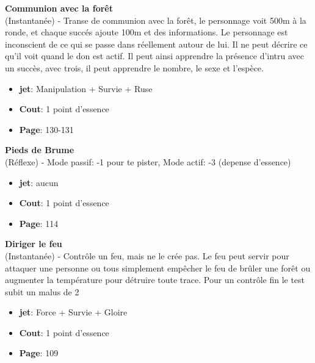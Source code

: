 \documentclass[oneside,12pt]{book}
\newcommand\don[6]{
\textbf{#1} \\
(#6) - #2
\begin{itemize}
\item{ \textbf{jet}: #3}
\item{ \textbf{Cout}: #4}
\item{ \textbf{Page}: #5}
\end{itemize}
\vspace{0.5cm}
}
\begin{document}
\begin{flushleft}
\don{Communion avec la forêt}{Transe de communion avec la forêt, le personnage voit 500m à la ronde, et chaque succés ajoute 100m et des informations. Le personnage est inconscient de ce qui se passe dans réellement autour de lui. Il ne peut décrire ce qu'il voit quand le don est actif. Il peut ainsi apprendre la présence d'intru avec un succès, avec trois, il peut apprendre le nombre, le sexe et l'espèce.}{Manipulation + Survie + Ruse}{1 point d'essence}{130-131}{Instantanée}
\don{Pieds de Brume}{Mode passif: -1 pour te pister, Mode actif: -3 (depense d'essence)}{aucun}{1 point d'essence}{114}{Réflexe}
\don{Diriger le feu}{Contrôle un feu, mais ne le crée pas. Le feu peut servir pour attaquer une personne ou tous simplement empêcher le feu de brûler une forêt ou augmenter la température pour détruire toute trace. Pour un contrôle fin le test subit un malus de 2}{Force + Survie + Gloire}{1 point d'essence}{109}{Instantanée}

\clearpage

\end{flushleft}
\end{document}
